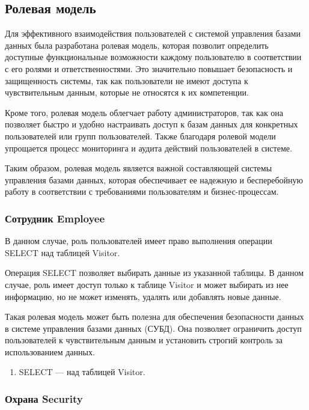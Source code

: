 \subsection{Ролевая модель}

Для эффективного взаимодействия пользователей с системой управления базами данных была разработана ролевая модель, которая позволит определить доступные функциональные возможности каждому пользователю в соответствии с его ролями и ответственностями. Это значительно повышает безопасность и защищенность системы, так как пользователи не имеют доступа к чувствительным данным, которые не относятся к их компетенции.

Кроме того, ролевая модель облегчает работу администраторов, так как она позволяет быстро и удобно настраивать доступ к базам данных для конкретных пользователей или групп пользователей. Также благодаря ролевой модели упрощается процесс мониторинга и аудита действий пользователей в системе.

Таким образом, ролевая модель является важной составляющей системы управления базами данных, которая обеспечивает ее надежную и бесперебойную работу в соответствии с требованиями пользователям и бизнес-процессам.

\subsubsection{Сотрудник Employee}

В данном случае, роль пользователей имеет право выполнения операции SELECT над таблицей Visitor.

Операция SELECT позволяет выбирать данные из указанной таблицы. В данном случае, роль имеет доступ только к таблице Visitor и может выбирать из нее информацию, но не может изменять, удалять или добавлять новые данные.

Такая ролевая модель может быть полезна для обеспечения безопасности данных в системе управления базами данных (СУБД). Она позволяет ограничить доступ пользователей к чувствительным данным и установить строгий контроль за использованием данных.

\begin{enumerate}[label=\arabic*.]
    \item SELECT --- над таблицей Visitor.
\end{enumerate}


\subsubsection{Охрана Security}

